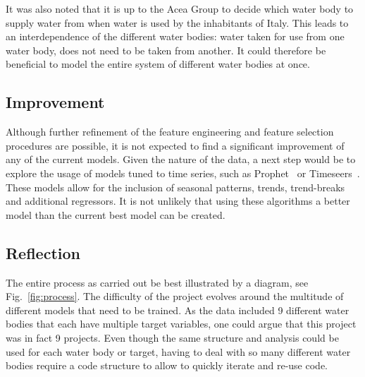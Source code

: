 \documentclass{article}
\begin{document}
It was also noted that it is up to the Acea Group to decide which water body to supply water from when water is used by the inhabitants of Italy. This leads to an interdependence of the different water bodies: water taken for use from one water body, does not need to be taken from another. It could therefore be beneficial to model the entire system of different water bodies at once.


\subsection*{Improvement}

Although further refinement of the feature engineering and feature selection procedures are possible, it is not expected to find a significant improvement of any of the current models. Given the nature of the data, a next step would be to explore the usage of models tuned to time series, such as Prophet~\cite{prophet} or Timeseers~\cite{timeseers}. These models allow for the inclusion of seasonal patterns, trends, trend-breaks and additional regressors. It is not unlikely that using these algorithms a better model than the current best model can be created. 

\subsection*{Reflection}

The entire process as carried out be best illustrated by a diagram, see Fig.~\ref{fig:process}. The difficulty of the project evolves around the multitude of different models that need to be trained. As the data included 9 different water bodies that each have multiple target variables, one could argue that this project was in fact 9 projects. Even though the same structure and analysis could be used for each water body or target, having to deal with so many different water bodies require a code structure to allow to quickly iterate and re-use code. 
\end{document}
